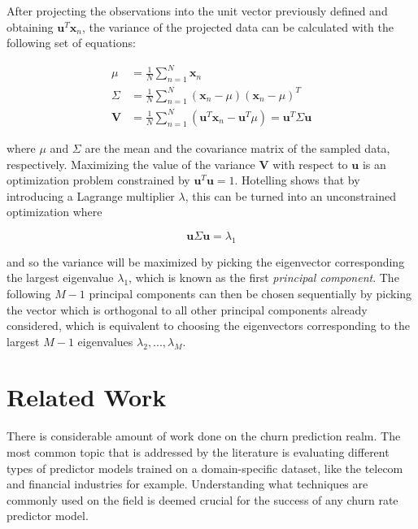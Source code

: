 \documentclass{kththesis}
\begin{document}
After projecting the observations into the unit vector previously defined and obtaining $\mathbf{u}^T\mathbf{x}_n$, the variance of the projected data can be calculated with the following set of equations:

\begin{equation}
\begin{aligned}
\mu &= \frac{1}{N}\sum_{n=1}^N \mathbf{x}_n \\
\Sigma &= \frac{1}{N}\sum_{n=1}^N (\mathbf{x}_n - \mu)(\mathbf{x}_n - \mu)^T \\
\mathbf{V} &= \frac{1}{N}\sum_{n=1}^N (\mathbf{u}^T\mathbf{x}_n - \mathbf{u}^T\mu) = \mathbf{u}^T\Sigma\mathbf{u}
\end{aligned}
\end{equation}

where $\mu$ and $\Sigma$ are the mean and the covariance matrix of the sampled data, respectively. Maximizing the value of the variance $\mathbf{V}$ with respect to $\mathbf{u}$ is an optimization problem constrained by $\mathbf{u}^T \mathbf{u}=1$. Hotelling\citep{hotelling1933analysis} shows that by introducing a Lagrange multiplier $\lambda$, this can be turned into an unconstrained optimization where

\begin{equation}
\mathbf{u}\Sigma\mathbf{u} = \lambda_1
\end{equation}
	
and so the variance will be maximized by picking the eigenvector corresponding the largest eigenvalue $\lambda_1$, which is known as the first \emph{principal component}. The following $M-1$ principal components can then be chosen sequentially by picking the vector which is orthogonal to all other principal components already considered, which is equivalent to choosing the eigenvectors corresponding to the largest $M-1$ eigenvalues $\lambda_2,..., \lambda_M$.

\chapter{Related Work}

There is considerable amount of work done on the churn prediction realm. The most common topic that is addressed by the literature is evaluating different types of predictor models trained on a domain-specific dataset, like the telecom and financial industries for example. Understanding what techniques are commonly used on the field is deemed crucial for the success of any churn rate predictor model.
\end{document}

